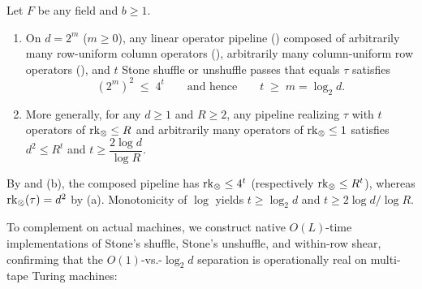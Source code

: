 \begin{theorem}\label{thm:osr-pass}
\label{cor:general-osr-pass}
Let $F$ be any field and $b \ge 1$.
\begin{enumerate}[label=(\alph*)]
\item On $d = 2^m$ ($m \ge 0$), any linear operator pipeline () composed of
  arbitrarily many row-uniform column operators (), arbitrarily many
  column-uniform row operators (), and $t$ Stone shuffle or unshuffle passes
  that equals $\tau$ satisfies
  \[
    (2^m)^2 \;\le\; 4^t \qquad\text{and hence}\qquad t \;\ge\; m = \log_2 d.
  \]
\item More generally, for any $d \ge 1$ and $R \ge 2$, any pipeline realizing $\tau$ with $t$
  operators of $\operatorname{rk}_{\otimes} \le R$ and arbitrarily many operators of $\operatorname{rk}_{\otimes} \le 1$ satisfies $d^2 \le R^t$
  and $t \ge \dfrac{2\log d}{\log R}$.
\end{enumerate}
\end{theorem}
\begin{outline}
By  and (b), the composed pipeline has
$\operatorname{rk}_{\otimes} \le 4^t$ (respectively $\operatorname{rk}_{\otimes} \le R^t$), whereas $\operatorname{rk}_{\otimes}(\tau) = d^2$ by (a).
Monotonicity of $\log$ yields $t \ge \log_2 d$ and $t \ge 2\log d / \log R$.
\end{outline}

To complement  on actual machines, we construct native $O(L)$-time
 implementations of Stone's shuffle, Stone's unshuffle, and within-row shear,
confirming that the $O(1)$-vs.-$\log_2 d$ separation is operationally real on multi-tape Turing
machines:

